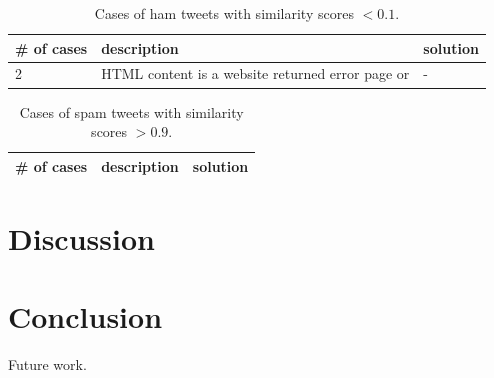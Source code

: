\documentclass[times, 11pt, twocolumn]{article}
\begin{document}
\begin{table}[!h]\centering
	\begin{tabular}{|p{1cm}|p{3cm}|p{3cm}|}
	\hline
	# of cases & description & solution \\
	\hline
	2 & HTML content is a website returned error page or  & - \\
	\hline
	\end{tabular}
	\caption{Cases of ham tweets with similarity scores $< 0.1$.}
	\label{low-sim-ham}
\end{table}

\begin{table}[!h]\centering
	\begin{tabular}{|p{1cm}|p{3cm}|p{3cm}|}
	\hline
	# of cases & description & solution \\
	\hline

	\hline
	\end{tabular}
	\caption{Cases of spam tweets with similarity scores $>0.9$.}
	\label{high-sim-spam}
\end{table}

\section{Discussion}


\section{Conclusion}
Future work.



\end{document}
